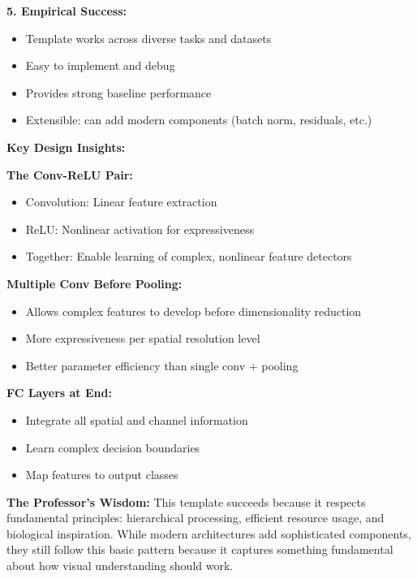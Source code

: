 \documentclass[12pt]{article}
\newcommand{\explanation}[1]{{\color{explanationcolor}#1}}
\begin{document}
\begin{enumerate}[(a)]
{{    \textbf{5. Empirical Success:}
    \begin{itemize}
        \item Template works across diverse tasks and datasets
        \item Easy to implement and debug
        \item Provides strong baseline performance
        \item Extensible: can add modern components (batch norm, residuals, etc.)
    \end{itemize}
    }
    
    \textbf{Key Design Insights:}
    
    \explanation{
    \textbf{The Conv-ReLU Pair:}
    \begin{itemize}
        \item Convolution: Linear feature extraction
        \item ReLU: Nonlinear activation for expressiveness
        \item Together: Enable learning of complex, nonlinear feature detectors
    \end{itemize}
    
    \textbf{Multiple Conv Before Pooling:}
    \begin{itemize}
        \item Allows complex features to develop before dimensionality reduction
        \item More expressiveness per spatial resolution level
        \item Better parameter efficiency than single conv + pooling
    \end{itemize}
    
    \textbf{FC Layers at End:}
    \begin{itemize}
        \item Integrate all spatial and channel information
        \item Learn complex decision boundaries
        \item Map features to output classes
    \end{itemize}
    }
    
    \textbf{The Professor's Wisdom:}
    \explanation{
    This template succeeds because it respects fundamental principles: hierarchical processing, efficient resource usage, and biological inspiration. While modern architectures add sophisticated components, they still follow this basic pattern because it captures something fundamental about how visual understanding should work.
    }
    }
    

\end{enumerate}
\end{document}

